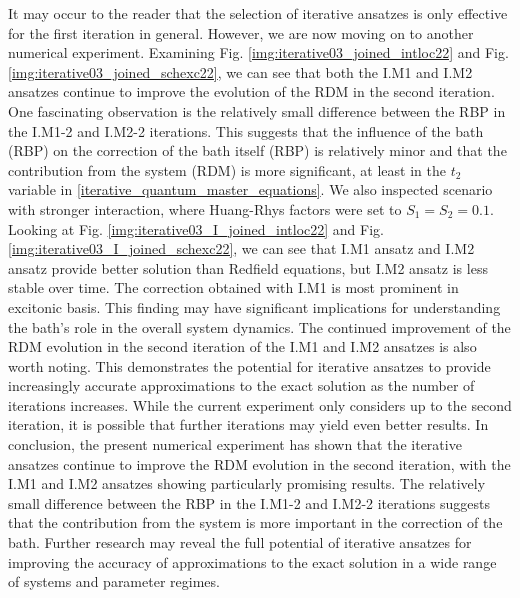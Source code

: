 It may occur to the reader that the selection of iterative ansatzes is only effective for the first iteration in general. However, we are now moving on to another numerical experiment. Examining Fig. \ref{img:iterative03_joined_intloc22} and Fig. \ref{img:iterative03_joined_schexc22}, we can see that both the I.M1 and I.M2 ansatzes continue to improve the evolution of the RDM in the second iteration. One fascinating observation is the relatively small difference between the RBP in the I.M1-2 and I.M2-2 iterations. This suggests that the influence of the bath (RBP) on the correction of the bath itself (RBP) is relatively minor and that the contribution from the system (RDM) is more significant, at least in the $t_2$ variable in \ref{iterative_quantum_master_equations}. We also inspected scenario with stronger interaction, where Huang-Rhys factors were set to $S_1=S_2=0.1$. Looking at Fig. \ref{img:iterative03_I_joined_intloc22} and Fig. \ref{img:iterative03_I_joined_schexc22}, we can see that I.M1 ansatz and I.M2 ansatz provide better solution than Redfield equations, but I.M2 ansatz is less stable over time. The correction obtained with I.M1 is most prominent in excitonic basis. This finding may have significant implications for understanding the bath's role in the overall system dynamics. The continued improvement of the RDM evolution in the second iteration of the I.M1 and I.M2 ansatzes is also worth noting. This demonstrates the potential for iterative ansatzes to provide increasingly accurate approximations to the exact solution as the number of iterations increases. While the current experiment only considers up to the second iteration, it is possible that further iterations may yield even better results. In conclusion, the present numerical experiment has shown that the iterative ansatzes continue to improve the RDM evolution in the second iteration, with the I.M1 and I.M2 ansatzes showing particularly promising results. The relatively small difference between the RBP in the I.M1-2 and I.M2-2 iterations suggests that the contribution from the system is more important in the correction of the bath. Further research may reveal the full potential of iterative ansatzes for improving the accuracy of approximations to the exact solution in a wide range of systems and parameter regimes. 

